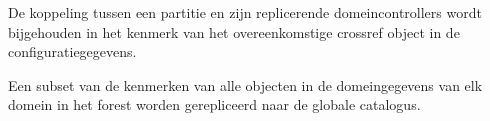 De koppeling tussen een partitie en zijn replicerende domeincontrollers wordt
bijgehouden in het  kenmerk van het
overeenkomstige crossref object in de configuratiegegevens.

Een subset van de kenmerken van alle objecten in de domeingegevens van elk
domein in het forest worden gerepliceerd naar de globale catalogus.
